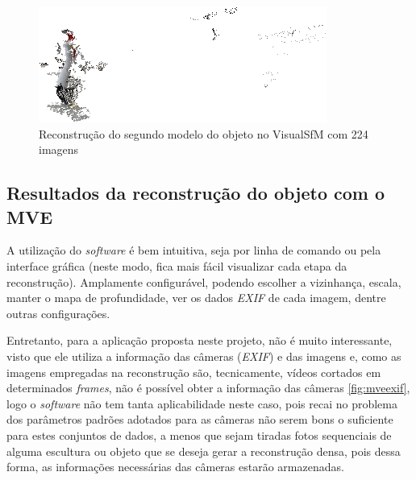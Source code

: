 \begin{figure}[!h]
	\centering
	\includegraphics[width=0.5\linewidth]{figs/galinhavisualsfm224.jpg}
	\caption{%
	Reconstrução do segundo modelo do objeto no VisualSfM com 224 imagens
	}\label{fig:reconstrucaoDensaVisualSFM2242}
\end{figure}

\subsection{Resultados da reconstrução do objeto com o MVE}

A utilização do \emph{software} é bem intuitiva, seja por linha de comando ou pela interface gráfica (neste modo, fica mais fácil visualizar cada etapa da reconstrução). Amplamente configurável, podendo escolher a vizinhança, escala, manter o mapa de profundidade, ver os dados \emph{EXIF} de cada imagem, dentre outras configurações.

Entretanto, para a aplicação proposta neste projeto, não é muito interessante, visto que ele utiliza a informação das câmeras (\emph{EXIF}) e das imagens e, como as imagens empregadas na reconstrução são, tecnicamente, vídeos cortados em determinados \emph{frames}, não é possível obter a informação das câmeras \ref{fig:mveexif}, logo o \emph{software} não tem tanta aplicabilidade neste caso, pois recai no problema dos parâmetros padrões adotados para as câmeras não serem bons o suficiente para estes conjuntos de dados, a menos que sejam tiradas fotos sequenciais de alguma escultura ou objeto que se deseja gerar a reconstrução densa, pois dessa forma, as informações necessárias das câmeras estarão armazenadas.

